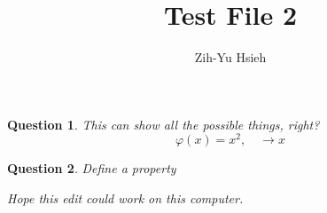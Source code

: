 \documentclass{article}
\title{Test File 2}
\author{Zih-Yu Hsieh}
\newtheorem{question}{Question}
\begin{document}
\maketitle

\begin{question}
    This can show all the possible things, right? 
    $$\varphi(x) = x^2,\quad \rightarrow x$$
\end{question}

\begin{question}
    Define a property

    Hope this edit could work on this computer.
\end{question}
\end{document}
